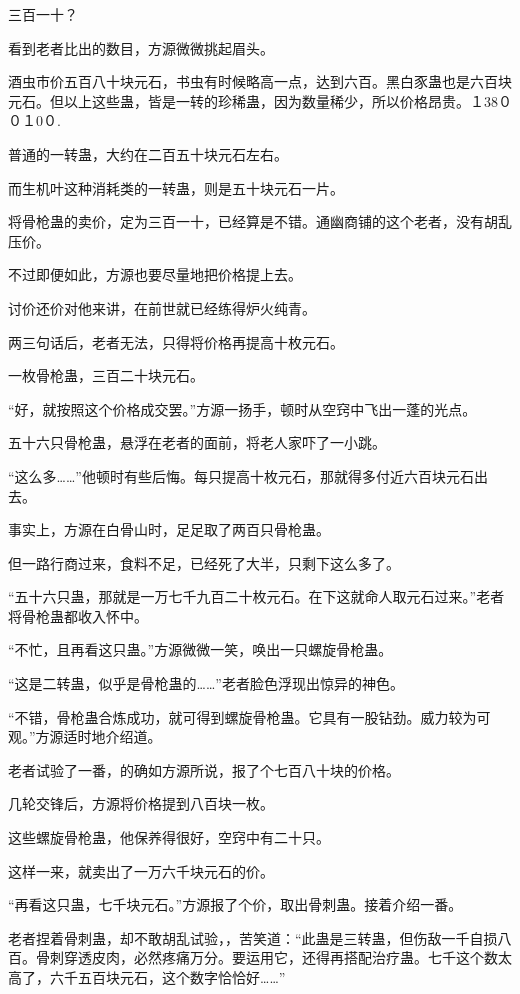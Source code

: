 
\begin{this_body}

三百一十？

看到老者比出的数目，方源微微挑起眉头。

酒虫市价五百八十块元石，书虫有时候略高一点，达到六百。黑白豕蛊也是六百块元石。但以上这些蛊，皆是一转的珍稀蛊，因为数量稀少，所以价格昂贵。１38００１0０.

普通的一转蛊，大约在二百五十块元石左右。

而生机叶这种消耗类的一转蛊，则是五十块元石一片。

将骨枪蛊的卖价，定为三百一十，已经算是不错。通幽商铺的这个老者，没有胡乱压价。

不过即便如此，方源也要尽量地把价格提上去。

讨价还价对他来讲，在前世就已经练得炉火纯青。

两三句话后，老者无法，只得将价格再提高十枚元石。

一枚骨枪蛊，三百二十块元石。

“好，就按照这个价格成交罢。”方源一扬手，顿时从空窍中飞出一蓬的光点。

五十六只骨枪蛊，悬浮在老者的面前，将老人家吓了一小跳。

“这么多……”他顿时有些后悔。每只提高十枚元石，那就得多付近六百块元石出去。

事实上，方源在白骨山时，足足取了两百只骨枪蛊。

但一路行商过来，食料不足，已经死了大半，只剩下这么多了。

“五十六只蛊，那就是一万七千九百二十枚元石。在下这就命人取元石过来。”老者将骨枪蛊都收入怀中。

“不忙，且再看这只蛊。”方源微微一笑，唤出一只螺旋骨枪蛊。

“这是二转蛊，似乎是骨枪蛊的……”老者脸色浮现出惊异的神色。

“不错，骨枪蛊合炼成功，就可得到螺旋骨枪蛊。它具有一股钻劲。威力较为可观。”方源适时地介绍道。

老者试验了一番，的确如方源所说，报了个七百八十块的价格。

几轮交锋后，方源将价格提到八百块一枚。

这些螺旋骨枪蛊，他保养得很好，空窍中有二十只。

这样一来，就卖出了一万六千块元石的价。

“再看这只蛊，七千块元石。”方源报了个价，取出骨刺蛊。接着介绍一番。

老者捏着骨刺蛊，却不敢胡乱试验，，苦笑道：“此蛊是三转蛊，但伤敌一千自损八百。骨刺穿透皮肉，必然疼痛万分。要运用它，还得再搭配治疗蛊。七千这个数太高了，六千五百块元石，这个数字恰恰好……”


\end{this_body}
